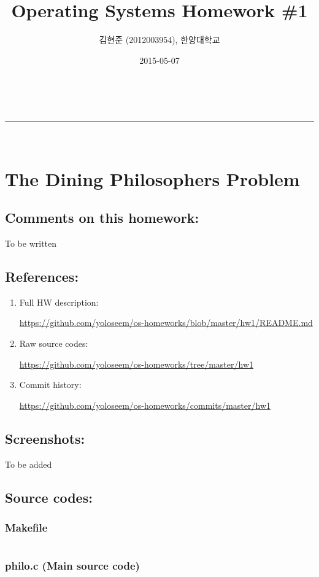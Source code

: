 \documentclass[a4paper,11pt]{article}
\makeatletter
\newcommand{\linia}{\rule{\linewidth}{0.5pt}}
\renewcommand{\maketitle}{
\begin{center}
\vspace{2ex}
{\huge \textsc{\@title}}
\vspace{1ex}
\\
\linia\\
\@author \hfill \@date
\vspace{4ex}
\end{center}
}
\makeatother
\begin{document}
\title{Operating Systems Homework \#1}

\author{김현준 (2012003954), 한양대학교}

\date{2015-05-07}

\maketitle

\section*{The Dining Philosophers Problem}

\subsection*{Comments on this homework:}
    To be written

\subsection*{References:}
\begin{enumerate}
\item
    Full HW description:
    
        \url{https://github.com/yoloseem/os-homeworks/blob/master/hw1/README.md}

\item
    Raw source codes:
    
        \url{https://github.com/yoloseem/os-homeworks/tree/master/hw1}

\item
    Commit history:
    
        \url{https://github.com/yoloseem/os-homeworks/commits/master/hw1}
\end{enumerate}

\subsection*{Screenshots:}
    To be added

\subsection*{Source codes:}

\subsubsection*{Makefile}
\inputminted[fontsize=\footnotesize,linenos]{basemake}{Makefile}

\subsubsection*{philo.c (Main source code)}
\inputminted[fontsize=\footnotesize,linenos]{c}{philo.c}
\end{document}
